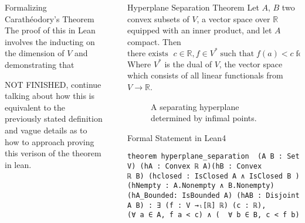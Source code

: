 \documentclass[final]{beamer}
\newlength{\sepwidth}
\newlength{\colwidth}
\newcommand{\separatorcolumn}{\begin{column}{\sepwidth}\end{column}}
\begin{document}
\begin{frame}[fragile]
\begin{columns}[t]
\begin{column}{\colwidth}
\begin{block}{Formalizing Carath\'eodory's Theorem}
              The proof of this in Lean involves the inducting on the dimension of $V$ and demonstrating that 

              NOT FINISHED,
              continue talking about how this is equivalent to the previously stated definition and vague details as to how to approach proving this verison of the theorem in lean. 
            \end{block}

            


            
            \begin{block*}
              
              

                
          
              
                  
                
            \end{block*}

            
        \end{column}

        \separatorcolumn

        \begin{column}{\colwidth}

            
            \begin{alertblock}{Hyperplane Separation Theorem}
                Let $A$, $B$ two convex subsets of $V$, a vector space over $\mathbb{R}$ equipped with an inner product, and let $A$ compact. Then $
                    \text{there exists } \; c\in \mathbb{R}, f \in V^* \; \text{such that} \; f(a) < c \; \text{for all}\; a\in A, \ c < f(b)\ \forall b\in B
                  $ Where $V^*$ is the dual of $V$, the vector space which consists of all linear functionals from $V\to \mathbb{R}$.
            \end{alertblock}

            \begin{figure}[htbp]
                \centering
                
                \caption{A separating hyperplane determined by infimal points. \label{fig:hyperplane-separation}}
            \end{figure}

\begin{block}{Formal Statement in Lean4}
\vspace{-0.5em}
\begin{Verbatim}
theorem hyperplane_separation  (A B : Set V) (hA : Convex ℝ A)(hB : Convex 
ℝ B) (hclosed : IsClosed A ∧ IsClosed B )(hNempty : A.Nonempty ∧ B.Nonempty) 
(hA_Bounded: IsBounded A) (hAB : Disjoint A B) : ∃ (f : V →ₗ[ℝ] ℝ) (c : ℝ),
(∀ a ∈ A, f a < c) ∧ (  ∀ b ∈ B, c < f b)
\end{Verbatim}
\end{block}


\end{column}
\end{columns}
\end{frame}
\end{document}
